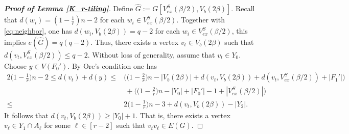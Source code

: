 \documentclass[11pt, a4paper]{article}
\theoremstyle{definition}
\newcommand{\<}{\subseteq}
\begin{document}
\begin{proof}[\bf Proof of Lemma \ref{K_r-tiling}]
Define $\hat{G}:=G[V_{ex}^S(\beta/2),V_b(2\beta)]$. Recall that $d(w_i)=(1-\frac{1}{r})n-2$ for each $w_i\in V_{ex}^S(\beta/2)$. Together with \eqref{eq:neighbor}, one has %
$d(w_i,V_b(2\beta))= q-2$ for each $w_i\in V_{ex}^S(\beta/2)$, this implies  $e(\hat{G})=q(q-2).$ Thus, there exists a vertex $v_t\in V_b(2\beta)$ such that  $d(v_t,V_{ex}^S(\beta/2))\leq q-2$.  %
Without loss of generality, assume that  %
$v_t\in Y_0$.  Choose $y\in V(F_0')$. By Ore's condition one has
\begin{align*}
2\Big(1-\frac{1}{r}\Big)n-2\leq d(v_t)+d(y)\leq &\Big(\Big(1-\frac{2}{r}\Big)n-|V_b(2\beta)|+d(v_t,V_b(2\beta))+d(v_t,V_{ex}^S(\beta/2))+|F_1'|\Big)\\
&\ +\Big(\Big(1-\frac{2}{r}\Big)n-|Y_0|+|F_0'|-1+|V_{ex}^S(\beta/2)|\Big)\\
\leq& 2\Big(1-\frac{1}{r}\Big)n
-3+d(v_t,V_b(2\beta))-|Y_2|. 
\end{align*}
 It follows that $d(v_t,V_b(2\beta))\geq |Y_0|+1$. That is, there exists a vertex $v_{\ell}\in Y_1\cap A_{\ell}$ for some $\ell\in [r-2]$ such that $v_tv_{\ell}\in E(G)$. 


\end{proof}
\end{document}
